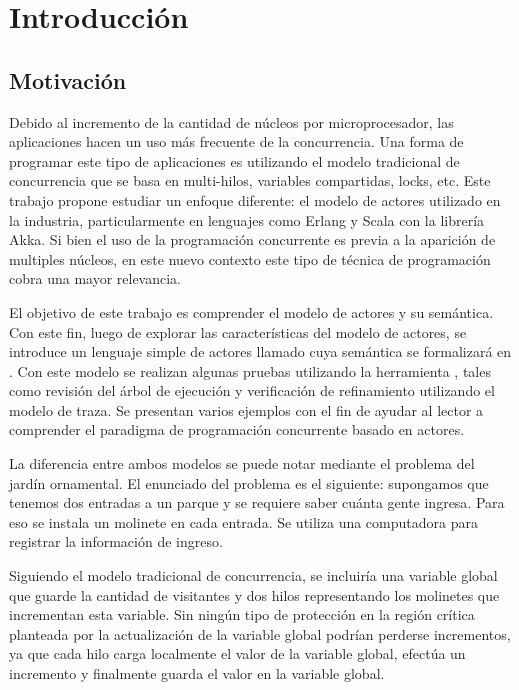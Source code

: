 \chapter{Introducción}

\section{Motivación}

Debido al incremento de la cantidad de núcleos por microprocesador, las aplicaciones hacen un uso más frecuente de la concurrencia. Una forma de programar este tipo de aplicaciones es utilizando el modelo tradicional de concurrencia que se basa en multi-hilos, variables compartidas, locks, etc. Este trabajo propone estudiar un enfoque diferente: el modelo de actores utilizado en la industria, particularmente en lenguajes como Erlang\cite{Cesarini:2009:EP:1717841, Armstrong:1996:CPE:229883} y Scala\cite{scala-overview-tech-report} con la librería Akka\cite{Wyatt:2013:AC:2663429}. Si bien el uso de la programación concurrente es previa a la aparición de multiples núcleos, en este nuevo contexto este tipo de técnica de programación cobra una mayor relevancia.

El objetivo de este trabajo es comprender el modelo de actores y su semántica. Con este fin, luego de explorar las características del modelo de actores, se introduce un lenguaje simple de actores llamado \SAL cuya semántica se formalizará en \CSP. Con este modelo se realizan algunas pruebas utilizando la herramienta \FDR, tales como revisión del árbol de ejecución y verificación de refinamiento utilizando el modelo de traza. Se presentan varios ejemplos con el fin de ayudar al lector a comprender el paradigma de programación concurrente basado en actores.

La diferencia entre ambos modelos se puede notar mediante el problema del jardín ornamental. El enunciado del problema es el siguiente: supongamos que tenemos dos entradas a un parque y se requiere saber cuánta gente ingresa. Para eso se instala un molinete en cada entrada. Se utiliza una computadora para registrar la información de ingreso.

Siguiendo el modelo tradicional de concurrencia, se incluiría una variable global que guarde la cantidad de visitantes y dos hilos representando los molinetes que incrementan esta variable. Sin ningún tipo de protección en la región crítica planteada por la actualización de la variable global podrían perderse incrementos, ya que cada hilo carga localmente el valor de la variable global, efectúa un incremento y finalmente guarda el valor en la variable global. 

